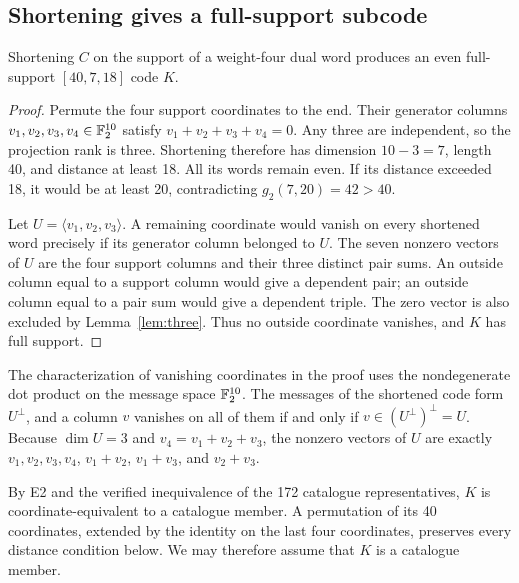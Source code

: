 \subsection{Shortening gives a full-support subcode}
\begin{lemma}\label{lem:mother}
Shortening $C$ on the support of a weight-four dual word produces an even full-support $[40,7,18]$ code $K$.
\end{lemma}
\begin{proof}
Permute the four support coordinates to the end. Their generator columns $v_1,v_2,v_3,v_4\in\mathbb F_2^{10}$ satisfy $v_1+v_2+v_3+v_4=0$. Any three are independent, so the projection rank is three. Shortening therefore has dimension $10-3=7$, length 40, and distance at least 18. All its words remain even. If its distance exceeded 18, it would be at least 20, contradicting $g_2(7,20)=42>40$.

Let $U=\langle v_1,v_2,v_3\rangle$. A remaining coordinate would vanish on every shortened word precisely if its generator column belonged to $U$. The seven nonzero vectors of $U$ are the four support columns and their three distinct pair sums. An outside column equal to a support column would give a dependent pair; an outside column equal to a pair sum would give a dependent triple. The zero vector is also excluded by Lemma~\ref{lem:three}. Thus no outside coordinate vanishes, and $K$ has full support.
\end{proof}
The characterization of vanishing coordinates in the proof uses the nondegenerate dot product on the message space $\mathbb F_2^{10}$. The messages of the shortened code form $U^\perp$, and a column $v$ vanishes on all of them if and only if $v\in(U^\perp)^\perp=U$. Because $\dim U=3$ and $v_4=v_1+v_2+v_3$, the nonzero vectors of $U$ are exactly $v_1,v_2,v_3,v_4$, $v_1+v_2$, $v_1+v_3$, and $v_2+v_3$.

By E2 and the verified inequivalence of the 172 catalogue representatives, $K$ is coordinate-equivalent to a catalogue member. A permutation of its 40 coordinates, extended by the identity on the last four coordinates, preserves every distance condition below. We may therefore assume that $K$ is a catalogue member.

